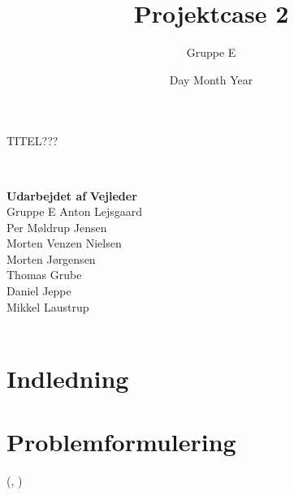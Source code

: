 \documentclass[12pt,a4paper]{report}
\title{Projektcase 2}
\author{Gruppe E}
\date{Day Month Year} %
\newcommand{\bestcite}[1]{(\citeauthor{#1}, \citeyear{#1})}
\begin{document}
\pagestyle{empty}
\maketitle
\centering
\begin{huge}
TITEL???
\end{huge}\\
\vspace*{3\baselineskip}
\raggedright {\textbf{Udarbejdet af}} \hfill {\textbf{Vejleder}\\
Gruppe E \hfill Anton Lejsgaard\\
Per Møldrup Jensen\\
Morten Venzen Nielsen\\
Morten Jørgensen\\
Thomas Grube\\
Daniel Jeppe\\
Mikkel Laustrup}\\
\vfill
{}\\
\raggedright %
\newpage
\section{Indledning}
\tableofcontents
\newpage
\pagestyle{fancy}
\section{Problemformulering}
\bestcite{El:1} %



\end{document}
